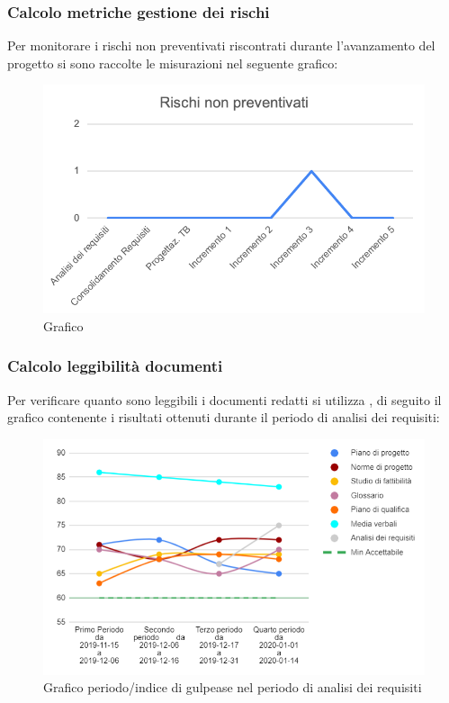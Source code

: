 \subsubsection{Calcolo metriche gestione dei rischi}
Per monitorare i rischi non preventivati riscontrati durante l'avanzamento del progetto si sono raccolte le misurazioni nel seguente grafico:

	\begin{figure}[H]
			\centering
			\includegraphics[width=0.8\linewidth]{./res/images/RischiNonPrevent_1.png}
			\caption{Grafico }
			\label{fig:Grafico i rischi non preventivati riscontrati in ogni fase}
		\end{figure}

\subsubsection{Calcolo leggibilità documenti}
Per verificare quanto sono leggibili i documenti redatti si utilizza , di seguito il grafico contenente i risultati ottenuti durante il periodo di analisi dei requisiti:

\begin{figure}[H]
	\centering
	\includegraphics[width=0.8\linewidth]{./res/images/gulpease.png}
	\caption{Grafico periodo/indice di gulpease nel periodo di analisi dei requisiti}
	\label{fig:Grafico indice di gulpease periodo di analisi dei requisiti}
\end{figure}

